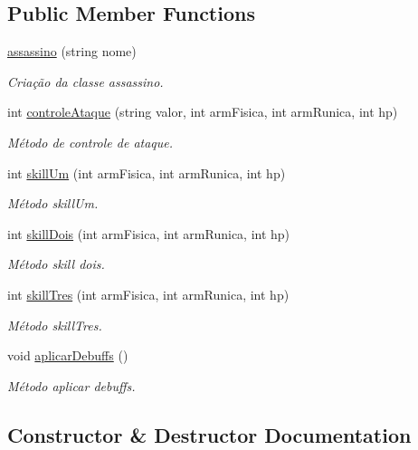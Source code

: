 \subsection*{Public Member Functions}
\begin{DoxyCompactItemize}
\item 
\mbox{\hyperlink{classassassino_a107c275bfe816f79279ec3976223974f}{assassino}} (string nome)
\begin{DoxyCompactList}\small\item\em Criação da classe assassino. \end{DoxyCompactList}\item 
int \mbox{\hyperlink{classassassino_a3f46fb60f6617502542fe7377a6499ab}{controle\+Ataque}} (string valor, int arm\+Fisica, int arm\+Runica, int hp)
\begin{DoxyCompactList}\small\item\em Método de controle de ataque. \end{DoxyCompactList}\item 
int \mbox{\hyperlink{classassassino_a02ee2eea7a7f1ca7ca8d1b88e481ab97}{skill\+Um}} (int arm\+Fisica, int arm\+Runica, int hp)
\begin{DoxyCompactList}\small\item\em Método skill\+Um. \end{DoxyCompactList}\item 
int \mbox{\hyperlink{classassassino_acd757ef4b59c18d2aa504a6afa15b107}{skill\+Dois}} (int arm\+Fisica, int arm\+Runica, int hp)
\begin{DoxyCompactList}\small\item\em Método skill dois. \end{DoxyCompactList}\item 
int \mbox{\hyperlink{classassassino_ad13d3c24ad8f2f3e0c7274a1a18a0d39}{skill\+Tres}} (int arm\+Fisica, int arm\+Runica, int hp)
\begin{DoxyCompactList}\small\item\em Método skill\+Tres. \end{DoxyCompactList}\item 
void \mbox{\hyperlink{classassassino_a283e61020246d2bec61fe8e661a412e9}{aplicar\+Debuffs}} ()
\begin{DoxyCompactList}\small\item\em Método aplicar debuffs. \end{DoxyCompactList}\end{DoxyCompactItemize}


\subsection{Constructor \& Destructor Documentation}
\mbox{\label{classassassino_a107c275bfe816f79279ec3976223974f}} 
